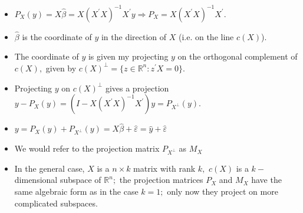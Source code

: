 \documentclass[notes=show]{beamer}
\begin{document}
\begin{frame}%


\begin{itemize}
\item $P_{X}(y)=X\widehat{\beta }=X(X^{\prime }X)^{-1}X^{\prime
}y\Rightarrow P_{X}=X(X^{\prime }X)^{-1}X^{\prime }.$

\item $\widehat{\beta }$ is the coordinate of $y$ in the direction of $X$
(i.e. on the line $c(X)$).

\item The coordinate of $y$ is given my projecting $y$ on the orthogonal
complement of $c(X),$ given by $c(X)^{\perp }=\{z\in \mathbb{R}%
^{n}:z^{\prime }X=0\}.$

\item Projecting $y$ on $c(X)^{\perp }$ gives a projection $%
y-P_{X}(y)=(I-X(X^{\prime }X)^{-1}X^{\prime })y=P_{X^{\perp }}(y).$

\item $y=P_{X}(y)+P_{X^{\perp }}(y)=X\widehat{\beta }+\widehat{\varepsilon }=%
\hat{y}+\hat{\varepsilon}$

\item We would refer to the projection matrix $P_{X^{\perp }}$ as $M_{X}$

\item In the general case, $X$ is a $n\times k$ matrix with rank $k,$ $c(X)$
is a $k-$dimensional subspace of $\mathbb{R}^{n};$ the projection matrices $%
P_{X}$ and $M_{X}$ have the same algebraic form as in the case $k=1;$ only
now they project on more complicated subspaces.
\end{itemize}

\end{frame}%
\end{document}
